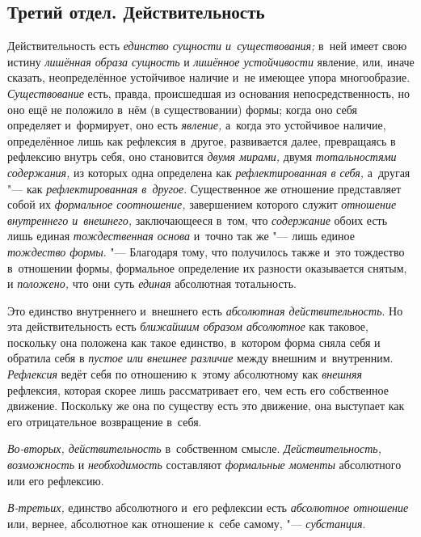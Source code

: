 \subsection[{\em Третий отдел.} ДЕЙСТВИТЕЛЬНОСТЬ]
{Третий отдел. Действительность}

Действительность есть {\em единство сущности и~существования;} в~ней имеет
свою истину {\em лишённая образа сущность} и
{\em лишённое устойчивости} явление, или, иначе
сказать, неопределённое устойчивое наличие и~не имеющее упора многообразие.
{\em Существование} есть, правда, происшедшая из
основания непосредственность, но оно ещё не положило в~нём (в
существовании) формы; когда оно себя определяет и~формирует, оно есть
{\em явление,} а~когда это устойчивое наличие,
определённое лишь как рефлексия в~другое, развивается далее, превращаясь в
рефлексию внутрь себя, оно становится {\em двумя
мирами,} двумя {\em тотальностями содержания,} из
которых одна определена как {\em рефлектированная в
себя,} а~другая "--- как {\em рефлектированная в~другое}.
Существенное же отношение представляет собой их
{\em формальное соотношение,} завершением которого
служит {\em отношение внутреннего и~внешнего,}
заключающееся в~том, что {\em содержание} обоих есть
лишь единая {\em тождественная основа} и~точно так же
"--- лишь единое {\em тождество формы}. "--- Благодаря тому,
что получилось также и~это тождество в~отношении формы, формальное
определение их разности оказывается снятым, и
{\em положено,} что они суть {\em единая} абсолютная тотальность.

Это единство внутреннего и~внешнего есть {\em абсолютная
действительность}. Но эта действительность есть
{\em ближайшим образом абсолютное} как таковое,
поскольку она положена как такое единство, в~котором форма сняла себя и
обратила себя в {\em пустое или внешнее различие} между
внешним и~внутренним. {\em Рефлексия} ведёт себя по
отношению к~этому абсолютному как {\em внешняя}
рефлексия, которая скорее лишь рассматривает его, чем есть его собственное
движение. Поскольку же она по существу есть это движение, она выступает как
его отрицательное возвращение в~себя.

{\em Во-вторых, действительность} в~собственном смысле.
{\em Действительность, возможность} и {\em необходимость} составляют
{\em формальные моменты} абсолютного или его рефлексию.

{\em В-третьих,} единство абсолютного и~его рефлексии
есть {\em абсолютное отношение} или, вернее, абсолютное
как отношение к~себе самому, "--- {\em субстанция}.

